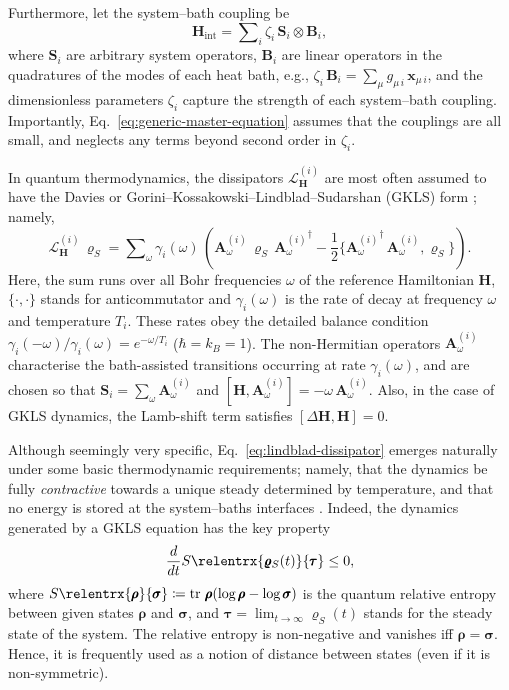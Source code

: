 \documentclass[aps,pra,superscriptaddress,twocolumn,nofootinbib]{revtex4-2}
\newcommand{\relentr}{S\relentrx}
\DeclareMathOperator{\tr}{tr}
\begin{document}
Furthermore, let the system--bath coupling be
\begin{equation}\label{eq:H_int}
    \pmb{H}_\text{int} = \sum\nolimits_i \zeta_i\,\pmb{S}_i\otimes\pmb{B}_i,
\end{equation}
where $ \pmb{S}_i $ are arbitrary system operators, $\pmb{B}_i$ are linear operators in the quadratures of the modes of each heat bath, e.g., $ \zeta_i\,\pmb{B}_i = \sum\nolimits_\mu g_{\mu\,i}\,\pmb{x}_{\mu\,i} $, and the dimensionless parameters $\zeta_i$ capture the strength of each system--bath coupling. Importantly, Eq.~\eqref{eq:generic-master-equation} assumes that the couplings are all small, and neglects any terms beyond second order in $\zeta_i$.

In quantum thermodynamics, the dissipators $\mathcal{L}_{\pmb{H}}^{(i)}$ are most often assumed to have the Davies or Gorini--Kossakowski--Lindblad--Sudarshan (GKLS) form \cite{davies1974,lindblad1976,gks1976}; namely,
\begin{equation}\label{eq:lindblad-dissipator}
\mathcal{L}_{\pmb{H}}^{(i)}\,\pmb{\varrho}_S = \sum\nolimits_{\omega} \gamma_i(\omega)\,\left(\pmb{A}^{(i)}_{\omega}\,\pmb{\varrho}_S\,{\pmb{A}_\omega^{(i)}}^{\dagger} - \frac12\{ {\pmb{A}_\omega^{(i)}}^{\dagger}\,\pmb{A}_\omega^{(i)},\pmb{\varrho}_S\}\right).
\end{equation}
Here, the sum runs over all Bohr frequencies $\omega$ of the reference Hamiltonian $ \pmb{H} $, $\{\cdot,\cdot\}$ stands for anticommutator and $\gamma_i(\omega)$ is the rate of decay at frequency $\omega$ and temperature $ T_i $. These rates obey the detailed balance condition $\gamma_i(-\omega)/\gamma_i(\omega) = e^{-\omega/T_i}$ ($ \hbar = k_B = 1 $). The non-Hermitian operators $\pmb{A}_\omega^{(i)}$ characterise the bath-assisted transitions occurring at rate $\gamma_i(\omega)$, and are chosen so that $ \pmb{S}_i = \sum\nolimits_\omega \pmb{A}_{\omega}^{(i)} $ and $[\pmb{H},\pmb{A}_\omega^{(i)}] = - \omega\,\pmb{A}_\omega^{(i)}$. Also, in the case of GKLS dynamics, the Lamb-shift term satisfies $[\Delta\pmb{H},\pmb{H}] = 0$.

Although seemingly very specific, Eq.~\eqref{eq:lindblad-dissipator} emerges naturally under some basic thermodynamic requirements; namely, that the dynamics be fully \textit{contractive} towards a unique steady determined by temperature, and that no energy is stored at the system--baths interfaces \cite{dann2021}. Indeed, the dynamics generated by a GKLS equation has the key property \cite{alicki1979,spohn1978,bp}
\begin{equation}\label{eq:contractivity}
    \frac{d}{dt}\relentr{\pmb{\varrho}_S(t)}{\pmb{\tau}} \leq 0,
\end{equation}
where $ \relentr{\pmb{\rho}}{\pmb{\sigma}} \coloneqq \tr\,\pmb{\rho}(\log{\pmb{\rho}}-\log{\pmb{\sigma}}) $ is the quantum relative entropy between given states $ \pmb{\rho} $ and $ \pmb{\sigma} $, and $\pmb{\tau} = \lim_{t\rightarrow\infty}\pmb{\varrho}_S(t)$ stands for the steady state of the system. The relative entropy is non-negative and vanishes iff $\pmb{\rho} = \pmb{\sigma} $. Hence, it is frequently used as a notion of distance between states (even if it is non-symmetric). 
\end{document}

